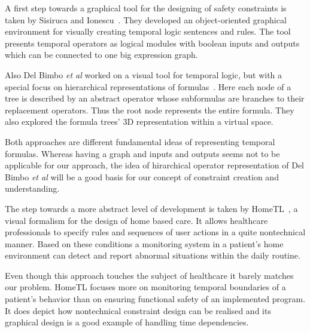 \documentclass[conference]{IEEEtran}
\begin{document}
A first step towards a graphical tool for the designing of safety constraints is taken by Sisiruca and Ionescu~\cite{332301}. They developed an object-oriented graphical environment for visually creating temporal logic sentences and rules. The tool presents temporal operators as logical modules with boolean inputs and outputs which can be connected to one big expression graph.

Also Del Bimbo {\em et al} worked on a visual tool for temporal logic, but with a special focus on hierarchical representations of formulas~\cite{520786}. Here each node of a tree is described by an abstract operator whose subformulas are branches to their replacement operators. Thus the root node represents the entire formula. They also explored the formula trees' 3D representation within a virtual space.

Both approaches are different fundamental ideas of representing temporal formulas. Whereas having a graph and inputs and outputs seems not to be applicable for our approach, the idea of hirarchical operator representation of Del Bimbo {\em et al} will be a good basis for our concept of constraint creation and understanding.


The step towards a more abstract level of development is taken by HomeTL~\cite{4341725}, a visual formalism for the design of home based care. It allows healthcare professionals to specify rules and sequences of user actions in a quite nontechnical manner. Based on these conditions a monitoring system in a patient's home environment can detect and report abnormal situations within the daily routine.

Even though this approach touches the subject of healthcare it barely matches our problem. HomeTL focuses more on monitoring temporal boundaries of a patient's behavior than on ensuring functional safety of an implemented program. It does depict how nontechnical constraint design can be realised and its graphical design is a good example of handling time dependencies.

\end{document}
